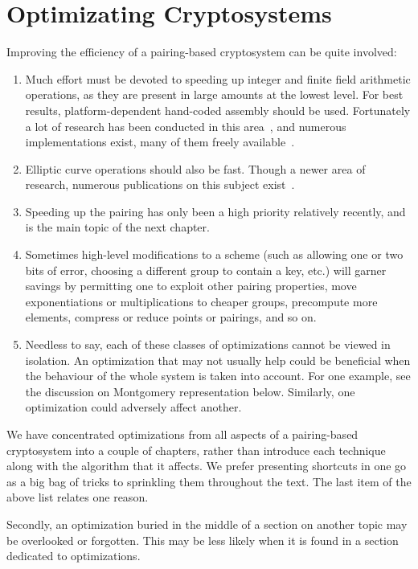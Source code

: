 \chapter{Optimizating Cryptosystems}

Improving the efficiency of a pairing-based cryptosystem can be quite involved:

\begin{enumerate}
\item
Much effort must be devoted to speeding up
integer and finite field arithmetic operations, as they are present
in large amounts at the lowest level. For best results, platform-dependent
hand-coded assembly should be used.
Fortunately a lot of research has been conducted in this area~\cite{taocp2},
and numerous implementations exist, many of them freely available~\cite{gmp, miracl}.
\item
Elliptic curve operations should also be fast. Though a newer area of research,
numerous publications on this subject exist~\cite{bss}.
\item
Speeding up the pairing has only been a high priority relatively recently,
and is the main topic of the next chapter.
\item
Sometimes high-level modifications to a scheme (such as allowing one or
two bits of error, choosing a different group to contain a key, etc.)
will garner savings by
permitting one to
exploit other pairing properties,
move exponentiations or multiplications to cheaper groups,
precompute more elements,
compress or reduce points or pairings, and so on.
\item
Needless to say, each of these classes of optimizations cannot be viewed
in isolation. An optimization that may not usually help could be beneficial
when the behaviour of the whole system is taken into account.
For one example, see the discussion on Montgomery representation below.
Similarly, one optimization could adversely affect another.
\end{enumerate}

We have concentrated optimizations from all aspects of
a pairing-based cryptosystem into a couple of chapters,
rather than introduce each technique along with the algorithm that it
affects. We prefer presenting shortcuts in one go as a big bag of tricks to
sprinkling them throughout the text.
The last item of the above list relates one reason.

Secondly, an optimization buried in the middle of a section on another topic
may be overlooked or forgotten. This may be less likely when it is found in
a section dedicated to optimizations.

